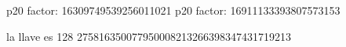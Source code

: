 p20 factor: 16309749539256011021
p20 factor: 16911133393807573153


la llave es 128   275816350077950008213266398347431719213

